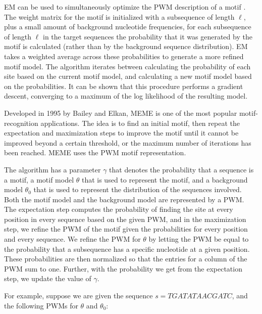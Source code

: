 EM can be used to simultaneously optimize the PWM description of a motif \cite{haeseleer}. The weight matrix for the motif is initialized with a subsequence of length $\ell$, plus a small amount of background nucleotide frequencies, for each subsequence of length $\ell$ in the target sequences the probability that it was generated by the motif is calculated (rather than by the background sequence distribution). EM takes a weighted average across these probabilities to generate a more refined motif model. The algorithm iterates between calculating the probability of each site based on the current motif model, and calculating a new motif model based on the probabilities. It can be shown that this procedure performs a gradient descent, converging to a maximum of the log likelihood of the resulting model.

Developed in 1995 by Bailey and Elkan, MEME \cite{BE95} is one of the most popular motif-recognition applications.  The idea is to find an initial motif, then repeat the expectation and maximization steps to improve the motif until it cannot be improved beyond a certain threshold, or the maximum number of iterations has been reached.  MEME uses the PWM motif representation.  

The algorithm has a parameter $\gamma$ that denotes the probability that a sequence is a motif, a motif model $\theta$ that is used to represent the motif, and a background model $\theta_0$ that is used to represent the distribution of the sequences involved.   Both the motif model and the background model are represented by a PWM.  The expectation step computes the probability of finding the site at every position in every sequence based on the given PWM, and in the maximization step, we refine the PWM of the motif given the probabilities for every position and every sequence.  We refine the PWM for $\theta$ by letting the PWM be equal to the probability that a subsequence has a specific nucleotide at a given position.  These probabilities are then normalized so that the entries for a column of the PWM sum to one. Further, with the probability we get from the expectation step, we update the value of $\gamma$.  

For example, suppose we are given the sequence $s = TGATATAACGATC$, and the following PWMs for $\theta$ and $\theta_0$:

